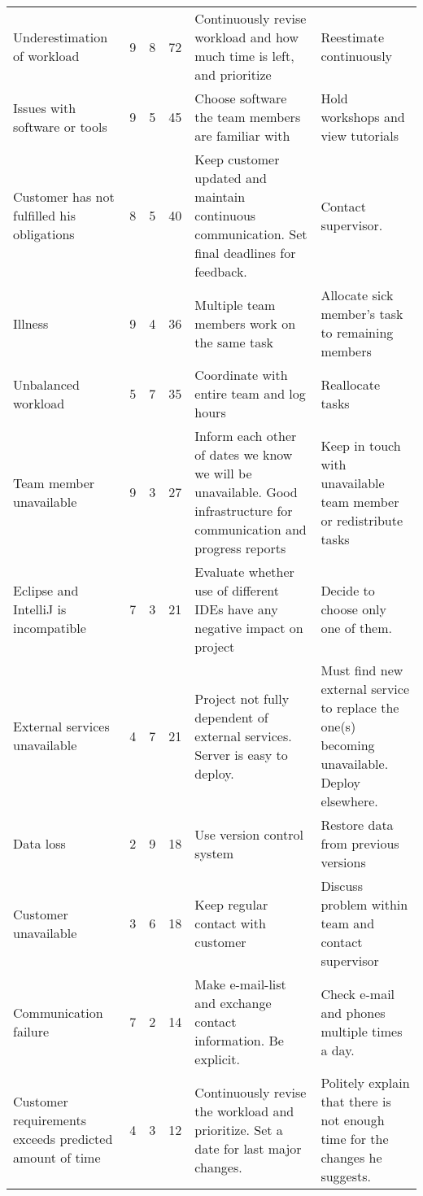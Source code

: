 \begin{longtable}{|p{3.6cm}!{\vrule width -1pt}l!{\vrule width -1pt}l!{\vrule width -1pt}l!{\vrule width -1pt}p{4.4cm}!{\vrule width -1pt}p{4.4cm}|}
\hline
{}Underestimation of workload & 9 & 8 & 72 & Continuously revise workload and how much time is left, and prioritize & Reestimate continuously\\
 Issues with software or tools & 9 & 5 & 45 & Choose software the team members are familiar with & Hold workshops and view tutorials\\
Customer has not fulfilled his obligations & 8 & 5 & 40 & Keep customer updated and maintain continuous communication. Set final deadlines for feedback. & Contact supervisor.\\
Illness & 9 & 4 & 36 & Multiple team members work on the same task& Allocate sick member's task to remaining members\\
 Unbalanced workload & 5 & 7 & 35 & Coordinate with entire team and log hours & Reallocate tasks\\
Team member unavailable & 9 & 3 & 27 & Inform each other of dates we know we will be unavailable. Good infrastructure for communication and progress reports & Keep in touch with unavailable team member or redistribute tasks\\
Eclipse and IntelliJ is incompatible & 7 & 3 & 21 & Evaluate whether use of different IDEs have any negative impact on project & Decide to choose only one of them. \\
External services unavailable & 4 & 7 & 21 & Project not fully dependent of external services. Server is easy to deploy. & Must find new external service to replace the one(s) becoming unavailable. Deploy elsewhere.\\
Data loss & 2 & 9 & 18 & Use version control system &Restore data from previous versions\\
Customer unavailable & 3 & 6 & 18 & Keep regular contact with customer & Discuss problem within team and contact supervisor\\
Communication failure & 7 & 2 & 14 & Make e-mail-list and exchange contact information. Be explicit. & Check e-mail and phones multiple times a day.\\
Customer requirements exceeds predicted amount of time& 4 & 3 & 12 & Continuously revise the workload and prioritize. Set a date for last major changes. & Politely explain that there is not enough time for the changes he suggests. \\

\end{longtable}
